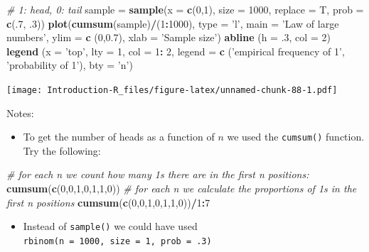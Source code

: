 \documentclass[]{book}
\newenvironment{Shaded}{\begin{snugshade}}{\end{snugshade}}
\newcommand{\CommentTok}[1]{\textcolor[rgb]{0.56,0.35,0.01}{\textit{#1}}}
\newcommand{\DataTypeTok}[1]{\textcolor[rgb]{0.13,0.29,0.53}{#1}}
\newcommand{\DecValTok}[1]{\textcolor[rgb]{0.00,0.00,0.81}{#1}}
\newcommand{\FloatTok}[1]{\textcolor[rgb]{0.00,0.00,0.81}{#1}}
\newcommand{\KeywordTok}[1]{\textcolor[rgb]{0.13,0.29,0.53}{\textbf{#1}}}
\newcommand{\NormalTok}[1]{#1}
\newcommand{\OperatorTok}[1]{\textcolor[rgb]{0.81,0.36,0.00}{\textbf{#1}}}
\newcommand{\StringTok}[1]{\textcolor[rgb]{0.31,0.60,0.02}{#1}}
\providecommand{\tightlist}{%
  \setlength{\itemsep}{0pt}\setlength{\parskip}{0pt}}
\begin{document}
\begin{Shaded}
\begin{Highlighting}[]
\CommentTok{# 1: head, 0: tail}
\NormalTok{sample =}\StringTok{ }\KeywordTok{sample}\NormalTok{(}\DataTypeTok{x =} \KeywordTok{c}\NormalTok{(}\DecValTok{0}\NormalTok{,}\DecValTok{1}\NormalTok{), }\DataTypeTok{size =} \DecValTok{1000}\NormalTok{, }\DataTypeTok{replace =}\NormalTok{ T, }\DataTypeTok{prob =} \KeywordTok{c}\NormalTok{(.}\DecValTok{7}\NormalTok{, }\FloatTok{.3}\NormalTok{))}
\KeywordTok{plot}\NormalTok{(}\KeywordTok{cumsum}\NormalTok{(sample)}\OperatorTok{/}\NormalTok{(}\DecValTok{1}\OperatorTok{:}\DecValTok{1000}\NormalTok{),}
     \DataTypeTok{type =} \StringTok{'l'}\NormalTok{,}
     \DataTypeTok{main =} \StringTok{'Law of large numbers'}\NormalTok{,}
     \DataTypeTok{ylim =} \KeywordTok{c}\NormalTok{ (}\DecValTok{0}\NormalTok{,}\FloatTok{0.7}\NormalTok{),}
     \DataTypeTok{xlab =} \StringTok{'Sample size'}\NormalTok{)}
\KeywordTok{abline}\NormalTok{ (}\DataTypeTok{h =} \FloatTok{.3}\NormalTok{, }\DataTypeTok{col =} \DecValTok{2}\NormalTok{)}
\KeywordTok{legend}\NormalTok{ (}\DataTypeTok{x =} \StringTok{'top'}\NormalTok{,}
       \DataTypeTok{lty =} \DecValTok{1}\NormalTok{, }\DataTypeTok{col =} \DecValTok{1}\OperatorTok{:}\StringTok{ }\DecValTok{2}\NormalTok{,}
       \DataTypeTok{legend =} \KeywordTok{c}\NormalTok{ (}\StringTok{'empirical frequency of 1'}\NormalTok{, }\StringTok{'probability of 1'}\NormalTok{),}
       \DataTypeTok{bty =} \StringTok{'n'}\NormalTok{)}
\end{Highlighting}
\end{Shaded}

\texttt{[image: Introduction-R\_files/figure-latex/unnamed-chunk-88-1.pdf]}

Notes:

\begin{itemize}
\tightlist
\item
  To get the number of heads as a function of \(n\) we used the \texttt{cumsum()} function. Try the following:
\end{itemize}

\begin{Shaded}
\begin{Highlighting}[]
\CommentTok{# for each n we count how many 1s there are in the first n positions:}
\KeywordTok{cumsum}\NormalTok{(}\KeywordTok{c}\NormalTok{(}\DecValTok{0}\NormalTok{,}\DecValTok{0}\NormalTok{,}\DecValTok{1}\NormalTok{,}\DecValTok{0}\NormalTok{,}\DecValTok{1}\NormalTok{,}\DecValTok{1}\NormalTok{,}\DecValTok{0}\NormalTok{)) }
\CommentTok{# for each n we calculate the proportions of 1s in the first n positions}
\KeywordTok{cumsum}\NormalTok{(}\KeywordTok{c}\NormalTok{(}\DecValTok{0}\NormalTok{,}\DecValTok{0}\NormalTok{,}\DecValTok{1}\NormalTok{,}\DecValTok{0}\NormalTok{,}\DecValTok{1}\NormalTok{,}\DecValTok{1}\NormalTok{,}\DecValTok{0}\NormalTok{))}\OperatorTok{/}\DecValTok{1}\OperatorTok{:}\DecValTok{7}
\end{Highlighting}
\end{Shaded}

\begin{itemize}
\tightlist
\item
  Instead of \texttt{sample()} we could have used \texttt{rbinom(n\ =\ 1000,\ size\ =\ 1,\ prob\ =\ .3)}
\end{itemize}


\end{document}
